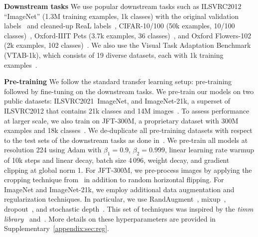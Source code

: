 {\bf Downstream tasks\;\;}
We use popular downstream tasks such as ILSVRC2012 ``ImageNet'' (1.3M training examples, 1k classes) with the original validation labels~\citep{deng2009-imagenet} and cleaned-up ReaL labels~\citep{beyer2020-imagenet},
CIFAR-10/100 (50k examples, 10/100 classes)~\citep{Krizhevsky2009-cifar},
Oxford-IIIT Pets (3.7k examples, 36 classes)~\citep{parkhi2012-pets},
and Oxford Flowers-102 (2k examples, 102 classes)~\citep{Nilsback2008-flowers}.
We also use the Visual Task Adaptation Benchmark (VTAB-1k), which consists of 19 diverse datasets, each with 1k training examples~\citep{vtab}.

{\bf Pre-training\;\;}
We follow the standard transfer learning setup: pre-training followed by fine-tuning on the downstream tasks.
We pre-train our models on two public datasets: 
ILSVRC2021~ImageNet, and ImageNet-21k, a superset of ILSVRC2012 that contains 21k classes and 14M images~\cite{deng2009-imagenet}.
To assess performance at 
larger scale, we also train on JFT-300M, a proprietary dataset with 300M examples and 18k classes~\citep{sun2017-jft}.
We de-duplicate all pre-training datasets with respect to the test sets of the downstream tasks as done in~\citet{Dosovitskiy2021,kolesnikov2020-bit}.
We pre-train all models at resolution 224
using Adam with $\beta_1=0.9$, $\beta_2=0.999$,
linear learning rate warmup of 10k steps and linear decay,
batch size 4\,096,
weight decay,
and gradient clipping at global norm 1.
For JFT-300M, we pre-process images by applying the cropping technique from~\citet{szegedy15inception} in addition to random horizontal flipping.
For ImageNet and ImageNet-21k, we employ additional data augmentation and regularization techniques. In particular, we use RandAugment~\cite{cubuk2020rand}, mixup~\cite{zhang2018mixup}, dropout~\cite{srivastava14dropout}, and stochastic depth~\cite{huang2016deep}. 
This set of techniques was inspired by the \emph{timm library}~\cite{rw2019timm} and~\citet{touvron2019}. 
More details on these hyperparameters are provided in Supplementary~\ref{appendix:sec:reg}.

